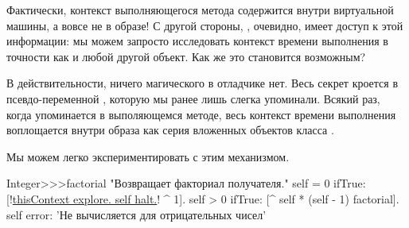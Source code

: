 \documentclass[a4paper,10pt,twoside]{book}
\begin{document}
{%
Фактически, контекст выполняющегося метода содержится внутри виртуальной машины, а вовсе не в образе!
С другой стороны, , очевидно, имеет доступ к этой информации: мы можем запросто исследовать контекст времени выполнения в точности как и любой другой объект.
Как же это становится возможным?

В действительности, ничего магического в отладчике нет.
Весь секрет кроется в псевдо-переменной , которую мы ранее лишь слегка упоминали.
Всякий раз, когда  упоминается в выполяющемся методе, весь контекст времени выполнения воплощается внутри образа как серия вложенных объектов класса .

Мы можем легко экспериментировать с этим механизмом.


\begin{code}{}
Integer>>>factorial
	"Возвращает факториал получателя."
	self = 0 ifTrue: [!\underline{thisContext explore. self halt.}! ^ 1].
	self > 0 ifTrue: [^ self * (self - 1) factorial].
	self error: 'Не вычисляется для отрицательных чисел'
\end{code}


}
\end{document}
